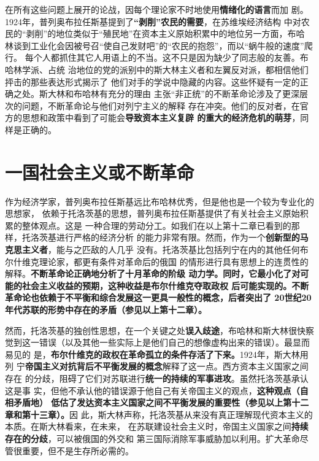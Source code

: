 在所有这些问题上展开的论战，因每个理论家不时地使用\textbf{情绪化的语言}而加
剧。1924年，普列奥布拉任斯基提到了\textbf{“剥削”农民的需要}，在苏维埃经济结构
中对农民的“剥削”的地位类似于“殖民地”在资本主义原始积累中的地位另一方面，布哈
林谈到工业化会因被号召“使自己发财吧”的“农民的抱怨”，而以“蜗牛般的速度”爬行。
每个人都抓住其它人用语上的不当。这不只是因为缺少了同志般的友善。布哈林学派、占统
治地位的党的派别中的斯大林主义者和左翼反对派，都相信他们抨击的那些表达形式揭示了
他们对手的学说中隐藏的内容。这些怀疑有一定的正确之处。斯大林和布哈林有充分的理由
主张“非正统”的不断革命论涉及了更深层次的问题，不断革命论与他们对列宁主义的解释
存在冲突。他们的反对者，在官方的思想和政策中看到了可能会\textbf{导致资本主义复辟
的重大的经济危机的萌芽}，同样是正确的。

\section{一国社会主义或不断革命}

作为经济学家，普列奥布拉任斯基远比布哈林优秀，但是他也是一个较为专业化的思想家，
依赖于托洛茨基的思想，普列奥布拉任斯基提供了有关社会主义原始积累的整体观点。这是
一种合理的劳动分工。如我们在以上第十二章已看到的那样，托洛茨基进行严格的经济分析
的能力非常有限。然而，作为一个\textbf{创新型的马克思主义者}，能与之匹敌的人几乎
没有。托洛茨基比包括列宁在内的其他任何布尔什维克理论家，都更有条件对革命后的俄国
的情形进行具有思想上的连贯性的解释。\textbf{不断革命论正确地分析了十月革命的阶级
动力学。同时，它最小化了对可能的社会主义收益的预期，这种收益是布尔什维克夺取政权
后可能实现的。不断革命论也依赖于不平衡和综合发展这一更具一般性的概念，后者突出了
20世纪20年代苏联的形势中存在的矛盾（参见以上第十二章）。}

然而，托洛茨基的独创性思想，在一个关键之处\textbf{误入歧途}，布哈林和斯大林很快察
觉到这一错误（以及其他一些实际上是他们自己的想像虚构出来的错误）。最显而易见的
是，\textbf{布尔什维克的政权在革命孤立的条件存活了下来。}1924年，斯大林用列
宁\textbf{帝国主义对抗背后不平衡发展的概念}解释了这一点。西方资本主义国家之间存在
的分歧，阻碍了它们对苏联进行\textbf{统一的持续的军事进攻}。虽然托洛茨基承认这是事
实，但他不承认他的错误源于他自己有关帝国主义的观点，\textbf{这种观点（自相矛盾地）
  低估了发达资本主义国家之间不平衡发展的重要性（参见以上第十二章和第十三章）。}因
此，斯大林声称，托洛茨基从来没有真正理解现代资本主义的本质。在斯大林看来，在未来，
在苏联建设社会主义时，帝国主义国家之间\textbf{持续存在的分歧}，可以被俄国的外交和
第三国际消除军事威胁加以利用。扩大革命尽管很重要，但不是生存所必需的。

